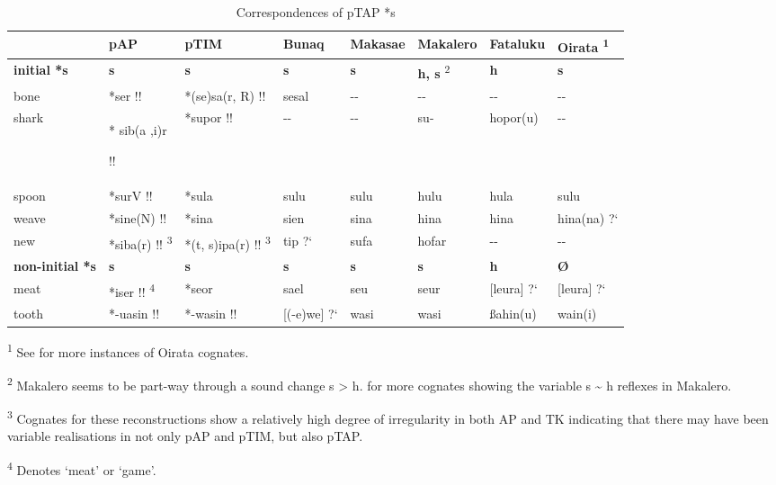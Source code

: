 \begin{sidewaystable}\centering


\begin{tabular}{llllllll}
\hline&pAP&pTIM&Bunaq&Makasae&Makalero&Fataluku&Oirata \textsuperscript{1}\\\hline
{\bfseries initial *s}&{\bfseries *s}&{\bfseries *s}&{\bfseries s}&{\bfseries s}&\textbf{h, s }\textsuperscript{2}&{\bfseries h}&{\bfseries s }\\\hline
bone&*ser !!&*(se)sa(r, R) !!&sesal&{}-{}-&{}-{}-&{}-{}-&{}-{}-\\
shark&* sib(a ,i)r

!!&*supor !!&{}-{}-&{}-{}-&su-&hopor(u)&{}-{}-\\
spoon&*surV !!&*sula&sulu &sulu &hulu &hula &sulu \\
weave&*sine(N) !!&*sina&sien &sina &hina &hina &hina(na) ?`\\
new &*siba(r) !! \textsuperscript{3}&*(t, s)ipa(r) !! \textsuperscript{3}&tip ?`&sufa&hofar&{}-{}-&{}-{}-\\\hline
{\bfseries non-initial *s}&{\bfseries *s}&{\bfseries *s}&{\bfseries s}&{\bfseries s}&{\bfseries s}&{\bfseries h}&{\bfseries {\O}}\\\hline
meat&*iser !! \textsuperscript{4}&*seor&sael&seu&seur&[leura] ?`&[leura] ?`\\
tooth &*-uasin !! &*-wasin !!&[(-e)we] ?`&wasi&wasi&{\ss}ahin(u)&wain(i)\\\hline

\end{tabular}

\begin{flushleft}\textsuperscript{1 }See \citet[209]{SchapperEtAl2012} for more instances of Oirata cognates.

\textsuperscript{2} Makalero seems to be part-way through a sound change s {\textgreater} h. \citet[209-211]{SchapperEtAl2012} for more cognates showing the variable s \~{} h reflexes in Makalero.

\textsuperscript{3} Cognates for these reconstructions show a relatively high degree of irregularity in both AP and TK indicating that there may have been variable realisations in not only pAP and pTIM, but also pTAP.

\textsuperscript{4} Denotes `meat' or `game'.\end{flushleft}\caption{Correspondences of pTAP *s}
\end{sidewaystable}


